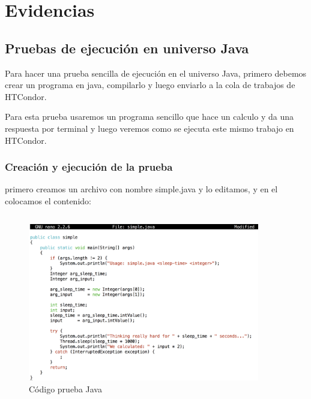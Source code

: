 
\chapter{Evidencias} %

\label{Chapter7} %


\section{Pruebas de ejecución en universo Java}
Para hacer una prueba sencilla de ejecución en el universo Java, primero debemos crear un programa en java, compilarlo y luego enviarlo a la cola de trabajos de HTCondor. 

Para esta prueba usaremos un programa sencillo que hace un calculo y da una respuesta por terminal y luego veremos como se ejecuta este mismo trabajo en HTCondor.

\subsection{Creación y ejecución de la prueba}

primero creamos un archivo con nombre simple.java y lo editamos, y en el colocamos el contenido:
\begin{lstlisting}[frame=single,
  basicstyle=\footnotesize\ttfamily,
  language=Java, 
  numbers=left, 
  numberstyle=\tiny\color{black},
  captionpos=b]

\end{lstlisting}

\begin{figure}[h]
\centering
\includegraphics[width=0.9\textwidth]{images/simplejava.png}
\decoRule
\caption{Código prueba Java}
\label{fig:java test}
\end{figure}
\FloatBarrier


